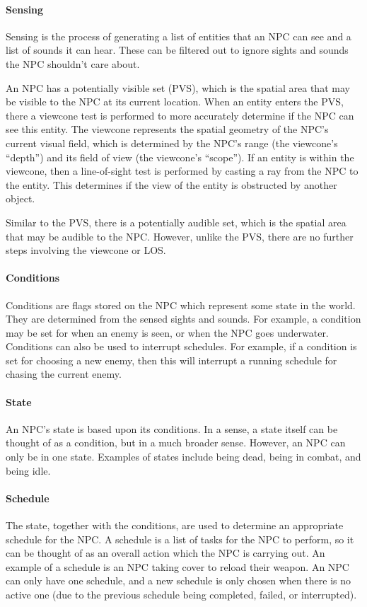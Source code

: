 \documentclass[a4paper, 12pt]{scrartcl}
\begin{document}
\paragraph{Sensing}
Sensing is the process of generating a list of entities that an NPC can see and a list of sounds it can hear. These can be filtered out to ignore sights and sounds the NPC shouldn't care about.

An NPC has a potentially visible set (PVS), which is the spatial area that may be visible to the NPC at its current location. When an entity enters the PVS, there a viewcone test is performed to more accurately determine if the NPC can see this entity. The viewcone represents the spatial geometry of the NPC's current visual field, which is determined by the NPC's range (the viewcone's ``depth'') and its field of view (the viewcone's ``scope''). If an entity is within the viewcone, then a line-of-sight test is performed by casting a ray from the NPC to the entity. This determines if the view of the entity is obstructed by another object.

Similar to the PVS, there is a potentially audible set, which is the spatial area that may be audible to the NPC. However, unlike the PVS, there are no further steps involving the viewcone or LOS.

\paragraph{Conditions}
Conditions are flags stored on the NPC which represent some state in the world. They are determined from the sensed sights and sounds. For example, a condition may be set for when an enemy is seen, or when the NPC goes underwater. Conditions can also be used to interrupt schedules. For example, if a condition is set for choosing a new enemy, then this will interrupt a running schedule for chasing the current enemy.

\paragraph{State}
An NPC's state is based upon its conditions. In a sense, a state itself can be thought of as a condition, but in a much broader sense. However, an NPC can only be in one state. Examples of states include being dead, being in combat, and being idle.

\paragraph{Schedule}
The state, together with the conditions, are used to determine an appropriate schedule for the NPC. A schedule is a list of tasks for the NPC to perform, so it can be thought of as an overall action which the NPC is carrying out. An example of a schedule is an NPC taking cover to reload their weapon. An NPC can only have one schedule, and a new schedule is only chosen when there is no active one (due to the previous schedule being completed, failed, or interrupted).
\end{document}
